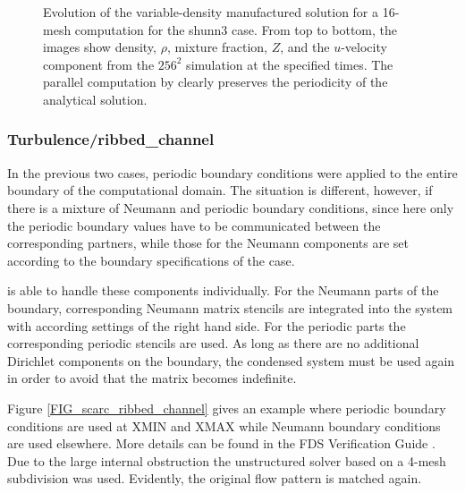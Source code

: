 \begin{figure}[ht]
\caption[Evolution of the variable-density manufactured solution for a 16-mesh \scarc{} computation]{Evolution of the variable-density manufactured solution for a 16-mesh \scarc{} computation for the {\ct shunn3} case.  From top to bottom, the images show density, $\rho$, mixture fraction, $Z$, and the $u$-velocity component from the $256^2$ simulation at the specified times. The parallel computation by \scarc{} clearly preserves the periodicity of the analytical solution.}
\label{FIG_scarc_shunn3}
\end{figure}




\subsubsection{Turbulence/ribbed\_channel}

In the previous two cases, periodic boundary conditions were applied to the entire boundary of the computational domain. The situation is different, however, if there is a mixture of Neumann and periodic boundary conditions, since here only the periodic boundary values have to be communicated between the corresponding partners, while those for the Neumann components are set according to the boundary specifications of the case.

\scarc{} is able to handle these components individually. For the Neumann parts of the boundary, corresponding Neumann matrix stencils are integrated into the system with according settings of the right hand side. For the periodic parts the corresponding periodic stencils are used.
As long as there are no additional Dirichlet components on the boundary, the condensed system must be used again
in order to avoid that the matrix becomes indefinite. 

Figure \ref{FIG_scarc_ribbed_channel} gives an example where periodic boundary conditions are used at
{\ct XMIN} and {\ct XMAX} while Neumann boundary conditions are used elsewhere.
More details can be found in the FDS Verification Guide \cite{McGrattan:2018:VG}.
Due to the large internal obstruction the unstructured \uscarc{} solver based on a 4-mesh subdivision was used. Evidently, the original flow pattern is matched again. 

